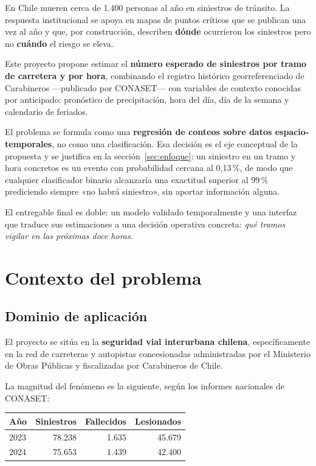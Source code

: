 \documentclass[11pt,a4paper]{article}
\begin{document}
En Chile mueren cerca de 1.400 personas al año en siniestros de tránsito. La
respuesta institucional se apoya en mapas de puntos críticos que se publican una
vez al año y que, por construcción, describen \textbf{dónde} ocurrieron los
siniestros pero no \textbf{cuándo} el riesgo se eleva.

Este proyecto propone estimar el \textbf{número esperado de siniestros por tramo
de carretera y por hora}, combinando el registro histórico georreferenciado de
Carabineros ---publicado por CONASET--- con variables de contexto conocidas por
anticipado: pronóstico de precipitación, hora del día, día de la semana y
calendario de feriados.

El problema se formula como una \textbf{regresión de conteos sobre datos
espacio-temporales}, no como una clasificación. Esa decisión es el eje
conceptual de la propuesta y se justifica en la sección~\ref{sec:enfoque}: un
siniestro en un tramo y hora concretos es un evento con probabilidad cercana al
0,13\,\%, de modo que cualquier clasificador binario alcanzaría una exactitud
superior al 99\,\% prediciendo siempre «no habrá siniestro», sin aportar
información alguna.

El entregable final es doble: un modelo validado temporalmente y una interfaz
que traduce sus estimaciones a una decisión operativa concreta: \emph{qué tramos
vigilar en las próximas doce horas}.

\section{Contexto del problema}

\subsection{Dominio de aplicación}

El proyecto se sitúa en la \textbf{seguridad vial interurbana chilena},
específicamente en la red de carreteras y autopistas concesionadas administradas
por el Ministerio de Obras Públicas y fiscalizadas por Carabineros de Chile.

La magnitud del fenómeno es la siguiente, según los informes nacionales de
CONASET:

\begin{center}
\begin{tabular}{lrrr}
\toprule
\textbf{Año} & \textbf{Siniestros} & \textbf{Fallecidos} & \textbf{Lesionados}\\
\midrule
2023 & 78.238 & 1.635 & 45.679\\
2024 & 75.653 & 1.439 & 42.400\\
\bottomrule
\end{tabular}
\end{center}
\end{document}
